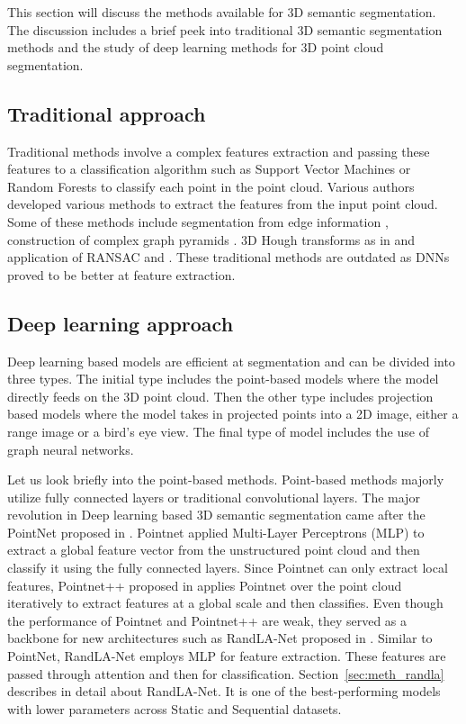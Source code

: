     This section will discuss the methods available for 3D semantic segmentation.
    The discussion includes a brief peek into traditional 3D semantic segmentation methods and the study of deep learning methods for 3D point cloud segmentation.

\subsection{Traditional approach}
Traditional methods involve a complex features extraction and passing these features to a classification algorithm such as Support Vector Machines or Random Forests to classify each point in the point cloud.
Various authors developed various methods to extract the features from the input point cloud.
Some of these methods include segmentation from edge information \cite{bhanu1986range}, construction of complex graph pyramids \cite{koster}.
3D Hough transforms as in \cite{vosselman20013d} and application of RANSAC \cite{schnabel2007efficient} and \cite{tarsha2007hough}.
These traditional methods are outdated as DNNs proved to be better at feature extraction.

\subsection{Deep learning approach}
\label{sec:dl_approach}
Deep learning based models are efficient at segmentation and can be divided into three types.
The initial type includes the point-based models where the model directly feeds on the 3D point cloud.
Then the other type includes projection based models where the model takes in projected points into a 2D image, either a range image or a bird's eye view.
The final type of model includes the use of graph neural networks.

Let us look briefly into the point-based methods. Point-based methods majorly utilize fully connected layers or traditional convolutional layers.
The major revolution in Deep learning based 3D semantic segmentation came after the PointNet proposed in \cite{Qi_2017_CVPR_pointnet}.
Pointnet applied Multi-Layer Perceptrons (MLP) to extract a global feature vector from the unstructured point cloud and then classify it using the fully connected layers.
Since Pointnet can only extract local features, Pointnet++ proposed in \cite{qi2017pointnet++} applies Pointnet over the point cloud iteratively to extract features at a global scale and then classifies.
Even though the performance of Pointnet and Pointnet++ are weak, they served as a backbone for new architectures such as RandLA-Net proposed in \cite{Hu_2020_CVPR_Randla}.
Similar to PointNet, RandLA-Net employs MLP for feature extraction. These features are passed through attention and then for classification.
 Section~\ref{sec:meth_randla} describes in detail about RandLA-Net.
It is one of the best-performing models with lower parameters across Static and Sequential datasets.

